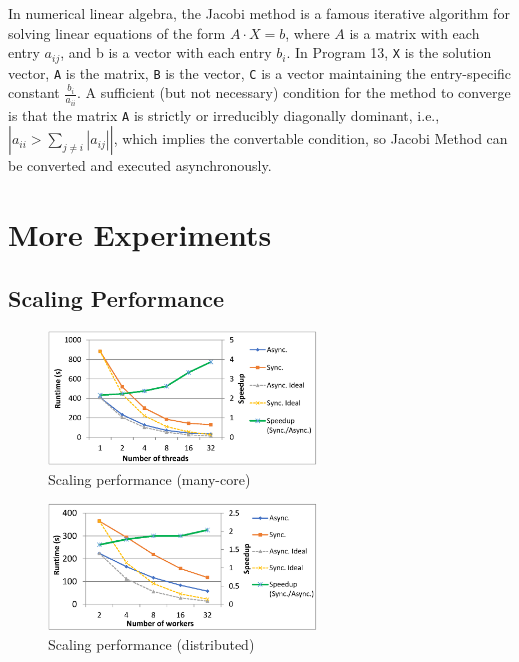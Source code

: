 \begin{appendix}
 In numerical linear algebra, the Jacobi method is a famous iterative algorithm for solving linear equations of the form $A\cdot X=b$, where $A$ is a matrix with each entry $a_{ij}$, and b is a vector with each entry $b_i$. In Program 13, \texttt{X} is the solution vector, \texttt{A} is the matrix, \texttt{B} is the vector, \texttt{C} is a vector maintaining the entry-specific constant $\frac{b_i}{a_{ii}}$. A sufficient (but not necessary) condition for the method to converge is that the matrix \texttt{A} is strictly or irreducibly diagonally dominant, i.e., $|a_{ii}>\sum_{j\neq i}{|a_{ij}|}|$, which implies the convertable condition, so Jacobi Method can be converted and executed asynchronously.
 
 
 \section{More Experiments}
 \label{sec:app:expr}
 
 \subsection{Scaling Performance}
 \label{sec:expr:scale}
 
 \begin{figure}[!t]
 	\centering
 	\includegraphics[width=2.8in]{fig/single-scalability}
 	\vspace{-0.1in}
 	\caption{Scaling performance (many-core)}
 	\label{fig:single-scalability}
 \end{figure}
 
 \begin{figure}[!t]
 	\centering
 	\includegraphics[width=2.8in]{fig/dist-scalability}
 	\vspace{-0.1in}
 	\caption{Scaling performance (distributed)}
 	\label{fig:dist-scalability}
 \end{figure}


\end{appendix}
